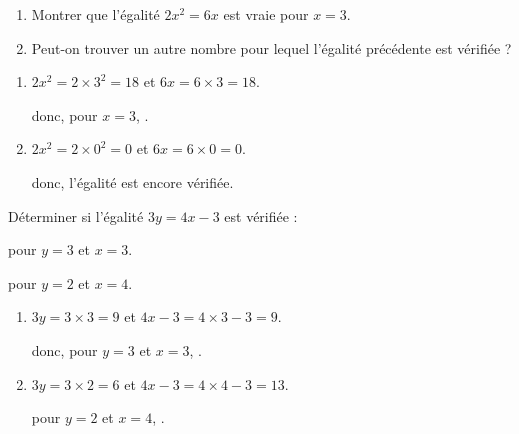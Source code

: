 \begin{Maquette}[Fiche,CorrigeFin,Colonnes=2]{}
\begin{multicols}{2}
      
      \begin{exercice} %
         \begin{enumerate}
            \item Montrer que l'égalité $2x^2 =6x$ est vraie pour $x =3$.
            \item Peut-on trouver un autre nombre pour lequel l'égalité précédente est vérifiée ?
         \end{enumerate}
      \end{exercice}
      
      \begin{Solution}
         \begin{enumerate}
            \item $2x^2 =2\times3^2 =18$ et $6x =6\times3 =18$. \par
            donc, pour $x =3$, .
            \item $2x^2 =2\times0^2 =0$ et $6x =6\times0 =0$. \par
            donc,  l'égalité est encore vérifiée.
         \end{enumerate}
      \end{Solution}
      
      
      \begin{exercice} %
         Déterminer si l'égalité $3y =4x-3$ est vérifiée :
         \begin{colenumerate}
            \item pour $y =3$ et $x =3$.
            \item pour $y =2$ et $x =4$.
         \end{colenumerate}
      \end{exercice}
      
      \begin{Solution}
         \begin{enumerate}
            \item $3y =3\times3 =9$ et $4x-3 =4\times3-3 =9$. \par
            donc, pour $y =3$ et $x =3$, .
            \item $3y =3\times2 =6$ et $4x-3 =4\times4-3 =13$. \par
            pour $y =2$ et $x =4$, .
         \end{enumerate}
      \end{Solution}
      

\end{multicols}
\end{Maquette}
